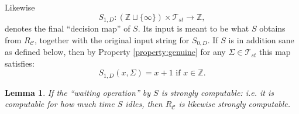 \documentclass[9pt,twocolumn,twoside,lineno]{pnas-new}
\numberwithin{equation}{section}
\newtheorem{lemma}[equation]{Lemma}
\theoremstyle{definition}
\theoremstyle{remark}
\begin{document}
Likewise $$S   _{1,D}: (\mathbb{Z} \sqcup \{\infty\}) \times \mathcal{T} _{st}   \to \mathbb{Z},
   $$ denotes the final
       ``decision map'' of $S$. Its input is meant to be what $S$ obtains from $R _{\mathcal{C}} $, together with the original input string for $S _{0,D} $.
If $S$ is in addition sane as defined below, then by Property  \ref{property:genuine} for any $\Sigma \in \mathcal{T} _{st} $ this map  satisfies: 
       \begin{equation} \label{eq:decision} S   _{1,D} (x, \Sigma)= x+1  \text{ if $x \in \mathbb{Z}$}.
\end{equation}
\begin{lemma} \label{lemma:computeWait}
   If the ``waiting operation'' by $S$ is strongly computable: i.e. it is computable for how much time $S$ idles,  then  $R _{\mathcal{C}} $ is likewise strongly computable. 
\end{lemma}
\end{document}
